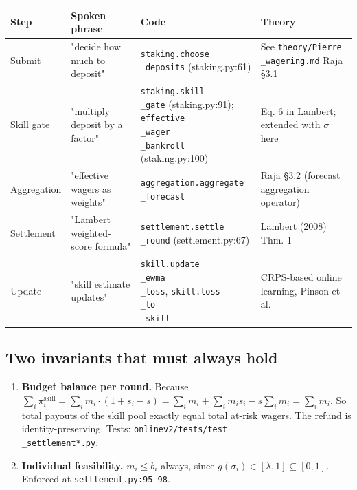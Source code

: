 \documentclass[11pt]{article}
\begin{document}
\begin{center}
\begin{tabular}{llll}
\toprule
Step & Spoken phrase & Code & Theory \\
\midrule
Submit & "decide how much to deposit" & \texttt{staking.choose\\_deposits} (staking.py:61) & See \texttt{theory/Pierre\\_wagering.md} Raja \S 3.1 \\
Skill gate & "multiply deposit by a factor" & \texttt{staking.skill\\_gate} (staking.py:91); \texttt{effective\\_wager\\_bankroll} (staking.py:100) & Eq. 6 in Lambert; extended with $\sigma$ here \\
Aggregation & "effective wagers as weights" & \texttt{aggregation.aggregate\\_forecast} & Raja \S 3.2 (forecast aggregation operator) \\
Settlement & "Lambert weighted-score formula" & \texttt{settlement.settle\\_round} (settlement.py:67) & Lambert (2008) Thm. 1 \\
Update & "skill estimate updates" & \texttt{skill.update\\_ewma\\_loss}, \texttt{skill.loss\\_to\\_skill} & CRPS-based online learning, Pinson et al. \\
\bottomrule
\end{tabular}
\end{center}

\subsection{Two invariants that must always hold}


\begin{enumerate}
\item \textbf{Budget balance per round.} Because $\sum_i \pi_i^{\text{skill}} = \sum_i m_i \cdot (1 + s_i - \bar s) = \sum_i m_i + \sum_i m_i s_i - \bar s \sum_i m_i = \sum_i m_i$. So total payouts of the skill pool exactly equal total at-risk wagers. The refund is identity-preserving. Tests: \texttt{onlinev2/tests/test\\_settlement*.py}.
\item \textbf{Individual feasibility.} $m_i \le b_i$ always, since $g(\sigma_i) \in [\lambda, 1] \subseteq [0,1]$. Enforced at \texttt{settlement.py:95--98}.
\end{enumerate}
\end{document}
